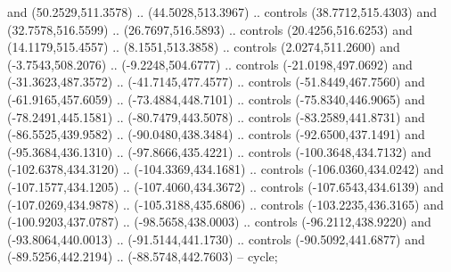 \begin{scope}[shift={(407.03862,-246.29561)}]
    and (50.2529,511.3578) .. (44.5028,513.3967) .. controls (38.7712,515.4303)
    and (32.7578,516.5599) .. (26.7697,516.5893) .. controls (20.4256,516.6253)
    and (14.1179,515.4557) .. (8.1551,513.3858) .. controls (2.0274,511.2600) and
    (-3.7543,508.2076) .. (-9.2248,504.6777) .. controls (-21.0198,497.0692) and
    (-31.3623,487.3572) .. (-41.7145,477.4577) .. controls (-51.8449,467.7560) and
    (-61.9165,457.6059) .. (-73.4884,448.7101) .. controls (-75.8340,446.9065) and
    (-78.2491,445.1581) .. (-80.7479,443.5078) .. controls (-83.2589,441.8731) and
    (-86.5525,439.9582) .. (-90.0480,438.3484) .. controls (-92.6500,437.1491) and
    (-95.3684,436.1310) .. (-97.8666,435.4221) .. controls (-100.3648,434.7132)
    and (-102.6378,434.3120) .. (-104.3369,434.1681) .. controls
    (-106.0360,434.0242) and (-107.1577,434.1205) .. (-107.4060,434.3672) ..
    controls (-107.6543,434.6139) and (-107.0269,434.9878) .. (-105.3188,435.6806)
    .. controls (-103.2235,436.3165) and (-100.9203,437.0787) ..
    (-98.5658,438.0003) .. controls (-96.2112,438.9220) and (-93.8064,440.0013) ..
    (-91.5144,441.1730) .. controls (-90.5092,441.6877) and (-89.5256,442.2194) ..
    (-88.5748,442.7603) -- cycle;


\end{scope}
